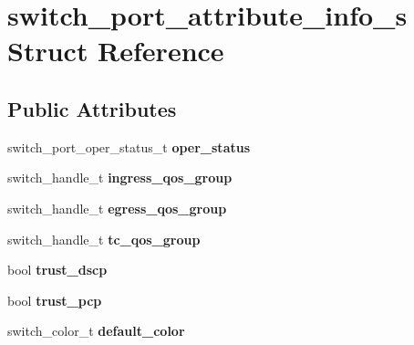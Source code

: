 \hypertarget{structswitch__port__attribute__info__s}{\section{switch\+\_\+port\+\_\+attribute\+\_\+info\+\_\+s Struct Reference}
\label{structswitch__port__attribute__info__s}
}
\subsection*{Public Attributes}
\begin{DoxyCompactItemize}
\item 
\hypertarget{structswitch__port__attribute__info__s_a34bf3e3a5c0f374dab0d8519378cc68e}{switch\+\_\+port\+\_\+oper\+\_\+status\+\_\+t {\bfseries oper\+\_\+status}}\label{structswitch__port__attribute__info__s_a34bf3e3a5c0f374dab0d8519378cc68e}

\item 
\hypertarget{structswitch__port__attribute__info__s_a1997f188a2a0e754c0d59e15ca208daa}{switch\+\_\+handle\+\_\+t {\bfseries ingress\+\_\+qos\+\_\+group}}\label{structswitch__port__attribute__info__s_a1997f188a2a0e754c0d59e15ca208daa}

\item 
\hypertarget{structswitch__port__attribute__info__s_a061f2c0bc1aff24c0e151340ba2a5066}{switch\+\_\+handle\+\_\+t {\bfseries egress\+\_\+qos\+\_\+group}}\label{structswitch__port__attribute__info__s_a061f2c0bc1aff24c0e151340ba2a5066}

\item 
\hypertarget{structswitch__port__attribute__info__s_aadb3e550405c6b954ad2ef7c77faa434}{switch\+\_\+handle\+\_\+t {\bfseries tc\+\_\+qos\+\_\+group}}\label{structswitch__port__attribute__info__s_aadb3e550405c6b954ad2ef7c77faa434}

\item 
\hypertarget{structswitch__port__attribute__info__s_a38e5d175b81b78fdefdbae02492695fa}{bool {\bfseries trust\+\_\+dscp}}\label{structswitch__port__attribute__info__s_a38e5d175b81b78fdefdbae02492695fa}

\item 
\hypertarget{structswitch__port__attribute__info__s_a38eba89674cc53d897bf2579626e8e50}{bool {\bfseries trust\+\_\+pcp}}\label{structswitch__port__attribute__info__s_a38eba89674cc53d897bf2579626e8e50}

\item 
\hypertarget{structswitch__port__attribute__info__s_a06415ce0dcd2186d2b2f78cc6d0fd7a5}{switch\+\_\+color\+\_\+t {\bfseries default\+\_\+color}}\label{structswitch__port__attribute__info__s_a06415ce0dcd2186d2b2f78cc6d0fd7a5}


\end{DoxyCompactItemize}

